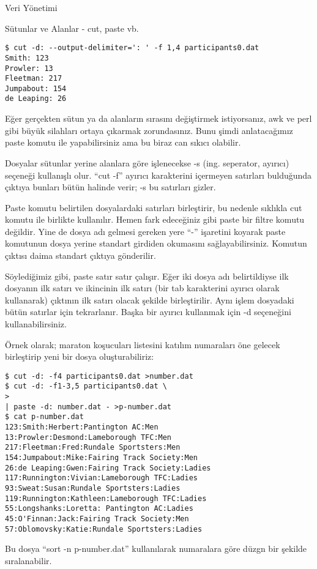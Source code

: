 \begin{section}{Veri Yönetimi}
\begin{subsection}{Sütunlar ve Alanlar - cut, paste vb.}
\footnotesize
\begin{verbatim}
$ cut -d: --output-delimiter=': ' -f 1,4 participants0.dat
Smith: 123
Prowler: 13
Fleetman: 217
Jumpabout: 154
de Leaping: 26
\end{verbatim}
\normalsize

Eğer gerçekten sütun ya da alanların sırasını değiştirmek istiyorsanız, awk ve perl gibi büyük silahları ortaya çıkarmak zorundasınız. Bunu şimdi anlatacağımız paste komutu ile yapabilirsiniz ama bu biraz can sıkıcı olabilir.

Dosyalar sütunlar yerine alanlara göre işlenecekse -s (ing. seperator, ayırıcı) seçeneği kullanışlı olur. “cut -f” ayırıcı karakterini içermeyen satırları bulduğunda çıktıya bunları bütün halinde verir; -s bu satırları gizler.

Paste komutu belirtilen dosyalardaki satırları birleştirir, bu nedenle sıklıkla cut komutu ile birlikte kullanılır. Hemen fark edeceğiniz gibi paste bir filtre komutu değildir. Yine de dosya adı gelmesi gereken yere “-” işaretini koyarak paste komutunun dosya yerine standart girdiden okumasını sağlayabilirsiniz. Komutun çıktısı daima standart çıktıya gönderilir.

Söylediğimiz gibi, paste satır satır çalışır. Eğer iki dosya adı belirtildiyse ilk dosyanın ilk satırı ve ikincinin ilk satırı (bir tab karakterini ayırıcı olarak kullanarak) çıktının ilk satırı olacak şekilde birleştirilir. Aynı işlem dosyadaki bütün satırlar için tekrarlanır. Başka bir ayırıcı kullanmak için -d seçeneğini kullanabilirsiniz.

Örnek olarak; maraton koşucuları listesini katılım numaraları öne gelecek birleştirip yeni bir dosya oluşturabiliriz:

\footnotesize
\begin{verbatim}
$ cut -d: -f4 participants0.dat >number.dat
$ cut -d: -f1-3,5 participants0.dat \
> 
| paste -d: number.dat - >p-number.dat
$ cat p-number.dat
123:Smith:Herbert:Pantington AC:Men
13:Prowler:Desmond:Lameborough TFC:Men
217:Fleetman:Fred:Rundale Sportsters:Men
154:Jumpabout:Mike:Fairing Track Society:Men
26:de Leaping:Gwen:Fairing Track Society:Ladies
117:Runnington:Vivian:Lameborough TFC:Ladies
93:Sweat:Susan:Rundale Sportsters:Ladies
119:Runnington:Kathleen:Lameborough TFC:Ladies
55:Longshanks:Loretta: Pantington AC:Ladies
45:O'Finnan:Jack:Fairing Track Society:Men
57:Oblomovsky:Katie:Rundale Sportsters:Ladies
\end{verbatim}
\normalsize

Bu dosya “sort -n p-number.dat” kullanılarak numaralara göre düzgn bir şekilde sıralanabilir.


\end{subsection}
\end{section}
